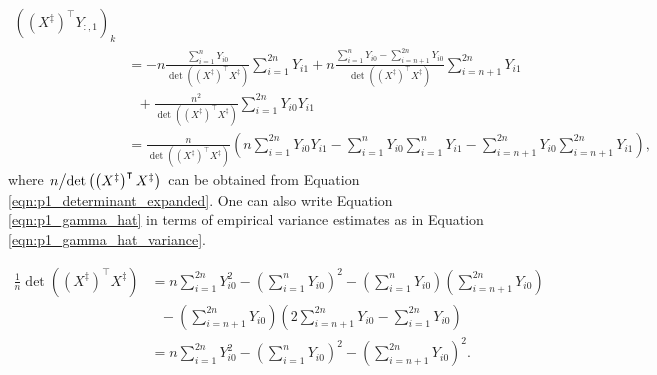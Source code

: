 \documentclass[letterpaper,11pt]{article}
\begin{document}
\begin{enumerate}
\begin{enumerate}
\begin{description}
\begin{align}
          \left(\left(X^\ddagger\right)^\intercal Y_{:,1}\right)_{k} \nonumber\\
        &= 
          -n\frac{\sum_{i=1}^n Y_{i0}}{\det\left(\left(X^\ddagger\right)^\intercal X^\ddagger\right)}
          \sum_{i=1}^{2n}Y_{i1} +
          n\frac{\sum_{i=1}^n Y_{i0} - \sum_{i=n+1}^{2n}Y_{i0}}{\det\left(\left(X^\ddagger\right)^\intercal X^\ddagger\right)}
          \sum_{i=n+1}^{2n}Y_{i1}
          \nonumber\\
        &~~~+ \frac{n^2}{\det\left(\left(X^\ddagger\right)^\intercal X^\ddagger\right)}
          \sum_{i=1}^{2n}Y_{i0}Y_{i1} \nonumber\\
        &= \frac{n}{\det\left(\left(X^\ddagger\right)^\intercal X^\ddagger\right)}
          \left(n\sum_{i=1}^{2n}Y_{i0}Y_{i1}
          -
          \sum_{i=1}^n Y_{i0}\sum_{i=1}^n Y_{i1}
          -
          \sum_{i=n+1}^{2n} Y_{i0}\sum_{i=n+1}^{2n} Y_{i1}
          \right),
          \nonumber
      \end{align}
      where
      $\left. n\middle/\det\left(\left(X^\ddagger\right)^\intercal
          X^\ddagger\right)\right.$ can be obtained from Equation
      \ref{eqn:p1_determinant_expanded}. One can also write Equation
      \ref{eqn:p1_gamma_hat} in terms of empirical variance estimates as in
      Equation \ref{eqn:p1_gamma_hat_variance}.

      \begin{align}
        \frac{1}{n}\det\left(\left(X^\ddagger\right)^\intercal X^\ddagger\right)
        &= n\sum_{i=1}^{2n}Y_{i0}^2 - \left(\sum_{i=1}^{n}Y_{i0}\right)^2 - \left(
          \sum_{i=1}^{n}Y_{i0}\right)\left(\sum_{i=n+1}^{2n}Y_{i0}\right) \nonumber\\
        &~~~- \left(\sum_{i=n+1}^{2n}Y_{i0}\right)\left(
          2\sum_{i=n + 1}^{2n} Y_{i0} - \sum_{i=1}^{2n}Y_{i0}
          \right) \nonumber\\
        &= n\sum_{i=1}^{2n}Y_{i0}^2 - \left(\sum_{i=1}^{n}Y_{i0}\right)^2 -
          \left(\sum_{i=n+1}^{2n}Y_{i0}\right)^2.
          \label{eqn:p1_determinant_expanded}
      \end{align}


\end{description}
\end{enumerate}
\end{enumerate}
\end{document}
